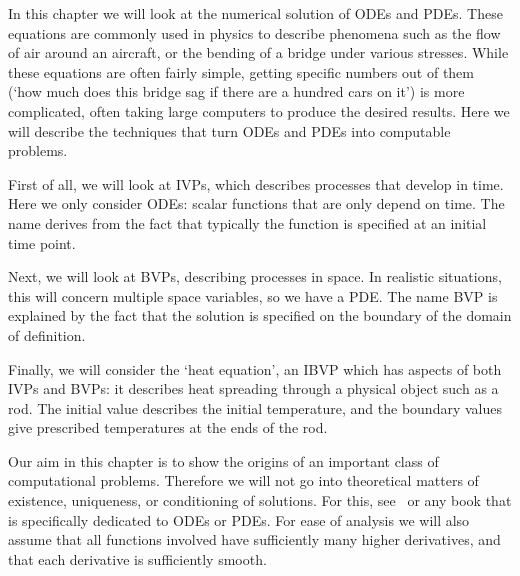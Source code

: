 
In this chapter we will look at the numerical solution of 
\acfp{ODE} and \acfp{PDE}.
These equations
are commonly used in physics to describe phenomena such as the
flow of air around an aircraft, or the bending of a bridge under
various stresses. While these equations are often fairly simple,
getting specific numbers out of them (`how much does this bridge sag
if there are a hundred cars on it') is more complicated, often taking large
computers to produce the desired results. Here we will describe the
techniques that turn \acp{ODE} and \acp{PDE} into computable problems.

First of all, we will look at \acfp{IVP}, which describes processes
that develop in time. Here we only consider \acp{ODE}: scalar functions that
are only depend on time. The name derives from the fact that typically
the function is specified at an initial time point.

Next, we will look at \acp{BVP}, describing processes in space. In
realistic situations, this will concern multiple space variables, so
we have a \ac{PDE}.
The name \ac{BVP} is explained by the fact that the solution is
specified on the boundary of the domain of definition.

Finally, we will consider the `heat equation', an \acf{IBVP}
which has
aspects of both \acp{IVP} and \acp{BVP}: it describes heat spreading through a
physical object such as a rod. The initial value describes the initial
temperature, and the boundary values give prescribed temperatures at
the ends of the rod.

Our aim in this chapter is to show the origins of an important class
of computational problems. Therefore we will not go into theoretical
matters of existence, uniqueness, or conditioning of solutions. For
this, see~\cite{Heath:scicomp} or any book that is specifically
dedicated to \acp{ODE} or \acp{PDE}.
For ease of analysis we will also assume that all functions involved
have sufficiently many higher derivatives, and that each derivative is
sufficiently smooth.

